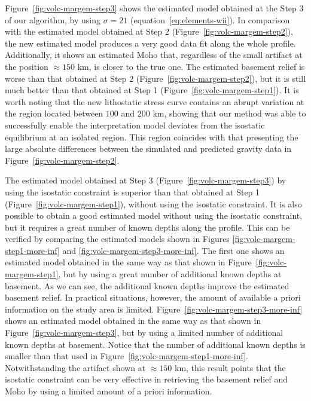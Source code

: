 \documentclass[manuscript]{geophysics}
\begin{document}
Figure~\ref{fig:volc-margem-step3} shows the estimated model obtained at the Step 3
of our algorithm, by using $\sigma = 21$ (equation~\ref{eq:elements-wii}). 
In comparison with the estimated model obtained at Step 2 
(Figure~\ref{fig:volc-margem-step2}), the new estimated model produces a very good 
data fit along the whole profile. Additionally, it shows an estimated Moho that,
regardless of the small artifact at the position $\approx 150$ km, is
closer to the true one.
The estimated basement relief is worse than that obtained at Step 2
(Figure~\ref{fig:volc-margem-step2}), but it is still much better than that obtained
at Step 1 (Figure~\ref{fig:volc-margem-step1}).
It is worth noting that the new lithostatic stress curve contains an abrupt variation
at the region located between $100$ and $200$ km,
showing that our method was able to successfully enable 
the interpretation model deviates from the isostatic equilibrium at an
isolated region. This region coincides with that presenting the large absolute 
differences between the simulated and predicted gravity data in Figure~\ref{fig:volc-margem-step2}.

The estimated model obtained at Step 3 (Figure~\ref{fig:volc-margem-step3})
by using the isostatic constraint is superior than that
obtained at Step 1 (Figure~\ref{fig:volc-margem-step1}),
without using the isostatic constraint.
It is also possible to obtain a good estimated model without using the 
isostatic constraint, but it requires a great number of known depths
along the profile. This can be verified by comparing the estimated models
shown in Figures \ref{fig:volc-margem-step1-more-inf} and
\ref{fig:volc-margem-step3-more-inf}. The first one shows an estimated model
obtained in the same way as that shown in 
Figure~\ref{fig:volc-margem-step1}, but by using a great number of additional 
known depths at basement. As we can see, the additional known depths
improve the estimated basement relief.
In practical situations, however, the amount of available a priori 
information on the study area is limited.
Figure~\ref{fig:volc-margem-step3-more-inf} shows an estimated model
obtained in the same way as that shown in Figure~\ref{fig:volc-margem-step3},
but by using a limited number of additional known depths at basement.
Notice that the number of additional known depths is smaller than that
used in Figure~\ref{fig:volc-margem-step1-more-inf}.
Notwithstanding the artifact shown at $\approx 150$ km,
this result points that the isostatic constraint can be very effective in 
retrieving the basement relief and Moho by using a limited amount of
a priori information. 
\end{document}

